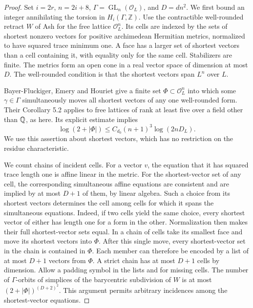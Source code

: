 \documentclass[a4paper,11pt]{article}
\theoremstyle{definition}
\theoremstyle{remark}
\newcommand{\ZZ}{\mathbb Z}\newcommand{\ord}{\operatorname{ord}}
\numberwithin{equation}{section}
\begin{document}
\begin{proof}
Set \(i=2r\), \(n=2i+8\), \(\Gamma=\operatorname{GL}_n(\mathcal O_L)\), and \(D=dn^2\). We first bound an integer annihilating the torsion in \(H_i(\Gamma,\ZZ)\). Use the contractible well-rounded retract \(W\) of Ash for the free lattice \(\mathcal O_L^n\). Its cells are indexed by the sets of shortest nonzero vectors for positive archimedean Hermitian metrics, normalized to have squared trace minimum one. A face has a larger set of shortest vectors than a cell containing it, with equality only for the same cell. Stabilizers are finite. The metrics form an open cone in a real vector space of dimension at most \(D\). The well-rounded condition is that the shortest vectors span \(L^n\) over \(L\).~\cite[Sec.~2.3]{II-II-II-beh17}

Bayer-Fluckiger, Emery and Houriet give a finite set \(\Phi\subset\mathcal O_L^n\) into which some \(\gamma\in\Gamma\) simultaneously moves all shortest vectors of any one well-rounded form. Their Corollary 5.2 applies to free lattices of rank at least five over a field other than \(\mathbb Q\), as here. Its explicit estimate implies
\[
    \log(2+|\Phi|)\le C_{d_0}(n+1)^3\log(2nD_L).
\]
We use this assertion about shortest vectors, which has no restriction on the residue characteristic.~\cite[Cor.~5.2]{II-II-II-beh17}

We count chains of incident cells. For a vector \(v\), the equation that it has squared trace length one is affine linear in the metric. For the shortest-vector set of any cell, the corresponding simultaneous affine equations are consistent and are implied by at most \(D+1\) of them, by linear algebra. Such a choice from its shortest vectors determines the cell among cells for which it spans the simultaneous equations. Indeed, if two cells yield the same choice, every shortest vector of either has length one for a form in the other. Normalization then makes their full shortest-vector sets equal. In a chain of cells take its smallest face and move its shortest vectors into \(\Phi\). After this single move, every shortest-vector set in the chain is contained in \(\Phi\). Each member can therefore be encoded by a list of at most \(D+1\) vectors from \(\Phi\). A strict chain has at most \(D+1\) cells by dimension. Allow a padding symbol in the lists and for missing cells. The number of \(\Gamma\)-orbits of simplices of the barycentric subdivision of \(W\) is at most \((2+|\Phi|)^{(D+2)^2}\). This argument permits arbitrary incidences among the shortest-vector equations.


\end{proof}
\end{document}
